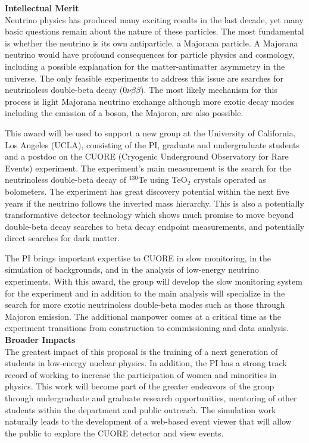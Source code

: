 \noindent
{\bf Intellectual Merit}
\\
Neutrino physics has produced many exciting results in the last decade, yet many basic  questions remain about the nature of these particles. The most fundamental is whether the neutrino is its own antiparticle, a Majorana particle. A Majorana neutrino would have profound consequences for particle physics and cosmology, including a possible explanation for the matter-antimatter asymmetry in the universe. The only feasible experiments to address this issue are searches for neutrinoless double-beta decay ($0\nu\beta\beta$).  The most likely mechanism for this process is light Majorana neutrino exchange although more exotic decay modes including the emission of a boson, the Majoron, are also possible.
 
This award will be used to support a new group at the University of California, Los Angeles (UCLA), consisting of the PI, graduate and undergraduate students and a postdoc on the CUORE (Cryogenic Underground Observatory for Rare Events) experiment. The experiment's main measurement is the search for the neutrinoless double-beta decay of $^{130}$Te using TeO$_2$ crystals operated as bolometers.  The experiment has great discovery potential within the next five years if the neutrino follows the inverted mass hierarchy. This is also a potentially transformative detector technology which shows much promise to move beyond double-beta decay searches to beta decay endpoint measurements, and potentially direct searches for dark matter.
 
The PI brings important expertise to CUORE in slow monitoring, in the simulation of backgrounds, and in the analysis of low-energy neutrino experiments. With this award, the group will develop the slow monitoring system for the experiment and in addition to the main analysis will specialize in the search for more exotic neutrinoless double-beta modes such as those through Majoron emission. The additional manpower comes at a critical time as the experiment transitions from construction to commissioning and data analysis.
\\ 

\noindent
{\bf Broader Impacts}
\\ 
 The greatest impact of this proposal is the training of a next generation of students in low-energy nuclear physics. In addition, the PI has a strong track record of working to increase the participation of women and minorities in physics. This work will become part of the greater endeavors of the group through undergraduate and graduate research opportunities, mentoring of other students within the department and public outreach.  The simulation work naturally leads to the development of a web-based event viewer that will allow the public to explore the CUORE detector and view events.
 